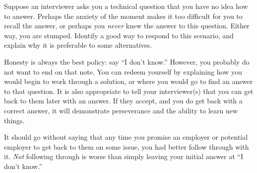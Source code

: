 

Suppose an interviewer asks you a technical question that you have no idea how to answer.  Perhaps the anxiety of the moment makes it too difficult for you to recall the answer, or perhaps you {\it never} knew the answer to this question.  Either way, you are stumped.  Identify a good way to respond to this scenario, and explain why it is preferable to some alternatives.

\vskip 50pt







Honesty is always the best policy: say ``I don't know.''  However, you probably do not want to end on that note.  You can redeem yourself by explaining how you would begin to work through a solution, or where you would go to find an answer to that question.  It is also appropriate to tell your interviewer(s) that you can get back to them later with an answer.  If they accept, and you do get back with a correct answer, it will demonstrate perseverance and the ability to learn new things.







It should go without saying that any time you promise an employer or potential employer to get back to them on some issue, you had better follow through with it.  {\it Not} following through is worse than simply leaving your initial answer at ``I don't know.''




